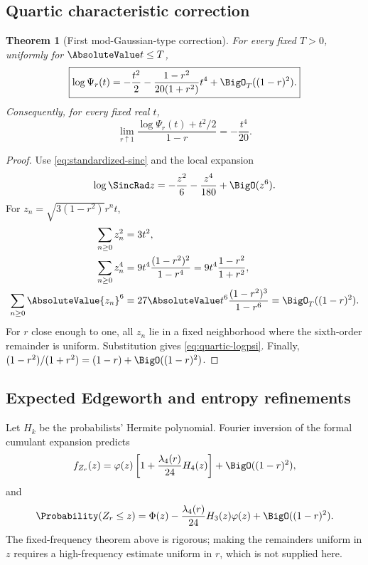 \documentclass[11pt]{article}
\newtheorem{theorem}{Theorem}[section]
\theoremstyle{definition}
\newcommand{\PhiN}{\Phi}
\newcommand{\phiN}{\varphi}
\begin{document}
\subsection{Quartic characteristic correction}

\begin{theorem}[First mod-Gaussian-type correction]\label{thm:quartic-correction}
For every fixed \(T>0\), uniformly for \(\AbsoluteValue t\le T\),
\begin{equation}
 \boxed{
 \log\Psi_r(t)
 =-\frac{t^2}{2}
 -\frac{1-r^2}{20(1+r^2)}t^4
 +\BigO_T((1-r)^2).}                                      \label{eq:quartic-logpsi}
\end{equation}
Consequently, for every fixed real \(t\),
\begin{equation}
 \lim_{r\uparrow1}
 \frac{\log\Psi_r(t)+t^2/2}{1-r}
 =-\frac{t^4}{20}.                                        \label{eq:quartic-limit}
\end{equation}
\end{theorem}

\begin{proof}
Use \cref{eq:standardized-sinc} and the local expansion
\[
 \log\SincRad z=-\frac{z^2}{6}-\frac{z^4}{180}+\BigO(z^6).
\]
For \(z_n=\sqrt{3(1-r^2)}r^nt\),
\begin{align*}
 \sum_{n\ge0}z_n^2&=3t^2,\\
 \sum_{n\ge0}z_n^4&=9t^4\frac{(1-r^2)^2}{1-r^4}
 =9t^4\frac{1-r^2}{1+r^2},\\
 \sum_{n\ge0}\AbsoluteValue{z_n}^6
 &=27\AbsoluteValue t^6\frac{(1-r^2)^3}{1-r^6}
 =\BigO_T((1-r)^2).
\end{align*}
For \(r\) close enough to one, all \(z_n\) lie in a fixed neighborhood where the
sixth-order remainder is uniform.  Substitution gives \cref{eq:quartic-logpsi}.
Finally, \((1-r^2)/(1+r^2)=(1-r)+\BigO((1-r)^2)\).
\end{proof}

\subsection{Expected Edgeworth and entropy refinements}

Let \(H_k\) be the probabilists' Hermite polynomial.  Fourier inversion of the formal
cumulant expansion predicts
\begin{equation}
 f_{Z_r}(z)=\phiN(z)
 \left[1+\frac{\lambda_4(r)}{24}H_4(z)\right]
 +\BigO((1-r)^2),                                         \label{eq:formal-edgeworth-density}
\end{equation}
and
\begin{equation}
 \Probability(Z_r\le z)=\PhiN(z)
 -\frac{\lambda_4(r)}{24}H_3(z)\phiN(z)
 +\BigO((1-r)^2).                                         \label{eq:formal-edgeworth-cdf}
\end{equation}
The fixed-frequency theorem above is rigorous; making the remainders uniform in \(z\)
requires a high-frequency estimate uniform in \(r\), which is not supplied here.
\end{document}
